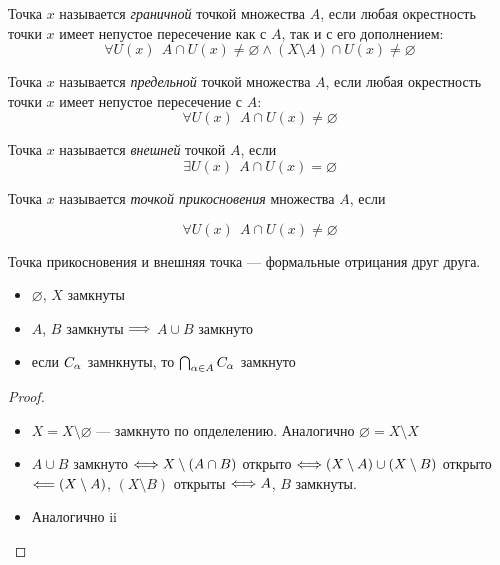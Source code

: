 \begin{definition}
    Точка $x$ называется \textit{граничной} точкой множества $A$, если любая окрестность
    точки $x$ имеет непустое пересечение как с $A$, так и с его дополнением:
\[
    \forall U(x)~~ A \cap U(x) \neq \varnothing \wedge (X \setminus A) \cap U(x)
    \neq \varnothing
\]
\end{definition}

\begin{definition}
    Точка $x$ называется \textit{предельной} точкой множества $A$, если любая
    окрестность точки $x$ имеет непустое пересечение с $A$:
\[
    \forall U(x)~~ A \cap U(x) \neq \varnothing
\]
\end{definition}

\begin{definition}
    Точка $x$ называется \textit{внешней} точкой $A$, если
\[
    \exists U(x)~~ A \cap U(x) = \varnothing
\]
\end{definition}

\begin{definition}
    Точка $x$ называется \textit{точкой прикосновения} множества $A$, если
\end{definition}
\[
    \forall U(x)~~ A \cap U(x) \neq \varnothing
\]

\begin{remark}
    Точка прикосновения и внешняя точка --- формальные отрицания друг друга.
\end{remark}

\begin{theorem}
    \enewline
    \begin{itemize}
        \item $\varnothing$, $X$ замкнуты
        \item $A$, $B$ замкнуты $\Longrightarrow$ $A \cup B$ замкнуто
        \item если $C_\alpha$ замнкнуты, то $\bigcap_{\alpha \in A}{C_\alpha}$ замкнуто
    \end{itemize}
\end{theorem}
\begin{proof}
    \enewline
    \begin{itemize}
        \item $X = X \setminus \varnothing$ --- замкнуто по опделелению.
        Аналогично $\varnothing = X \setminus X$
        \item $A \cup B$ замкнуто $\Longleftrightarrow X \setminus (A \cap B)$ открыто
        $\Longleftrightarrow (X \setminus A) \cup (X \setminus B)$ открыто $\Longleftarrow (X \setminus
        A)$, $(X \setminus B)$ открыты $\Longleftrightarrow A$, $B$ замкнуты.
        \item Аналогично ii
    \end{itemize}
\end{proof}

